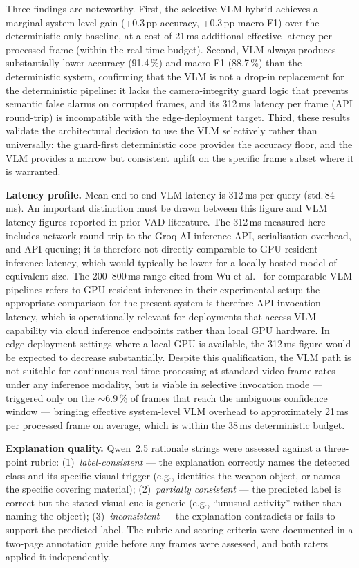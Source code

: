 \documentclass[a4paper,fleqn]{cas-dc}
\begin{document}
Three findings are noteworthy. First, the selective VLM hybrid achieves a marginal system-level gain (+0.3\,pp accuracy, +0.3\,pp macro-F1) over the deterministic-only baseline, at a cost of 21\,ms additional effective latency per processed frame (within the real-time budget). Second, VLM-always produces substantially lower accuracy (91.4\,\%) and macro-F1 (88.7\,\%) than the deterministic system, confirming that the VLM is not a drop-in replacement for the deterministic pipeline: it lacks the camera-integrity guard logic that prevents semantic false alarms on corrupted frames, and its 312\,ms latency per frame (API round-trip) is incompatible with the edge-deployment target. Third, these results validate the architectural decision to use the VLM selectively rather than universally: the guard-first deterministic core provides the accuracy floor, and the VLM provides a narrow but consistent uplift on the specific frame subset where it is warranted.
 
\textbf{Latency profile.}
Mean end-to-end VLM latency is 312\,ms per query (std.\,84\,ms).
An important distinction must be drawn between this figure and VLM latency figures reported in prior VAD literature. The 312\,ms measured here includes network round-trip to the Groq AI inference API, serialisation overhead, and API queuing; it is therefore not directly comparable to GPU-resident inference latency, which would typically be lower for a locally-hosted model of equivalent size. The 200--800\,ms range cited from Wu et al.~\citep{wu2024vadclip} for comparable VLM pipelines refers to GPU-resident inference in their experimental setup; the appropriate comparison for the present system is therefore API-invocation latency, which is operationally relevant for deployments that access VLM capability via cloud inference endpoints rather than local GPU hardware. In edge-deployment settings where a local GPU is available, the 312\,ms figure would be expected to decrease substantially. Despite this qualification, the VLM path is not suitable for continuous real-time processing at standard video frame rates under any inference modality, but is viable in selective invocation mode — triggered only on the $\sim$6.9\,\% of frames that reach the ambiguous confidence window — bringing effective system-level VLM overhead to approximately 21\,ms per processed frame on average, which is within the 38\,ms deterministic budget.
 
\textbf{Explanation quality.}
Qwen~2.5 rationale strings were assessed against a three-point rubric:
(1)~\emph{label-consistent} — the explanation correctly names the detected class and its specific visual trigger (e.g., identifies the weapon object, or names the specific covering material);
(2)~\emph{partially consistent} — the predicted label is correct but the stated visual cue is generic (e.g., ``unusual activity'' rather than naming the object);
(3)~\emph{inconsistent} — the explanation contradicts or fails to support the predicted label.
The rubric and scoring criteria were documented in a two-page annotation guide before any frames were assessed, and both raters applied it independently.
 
\end{document}
